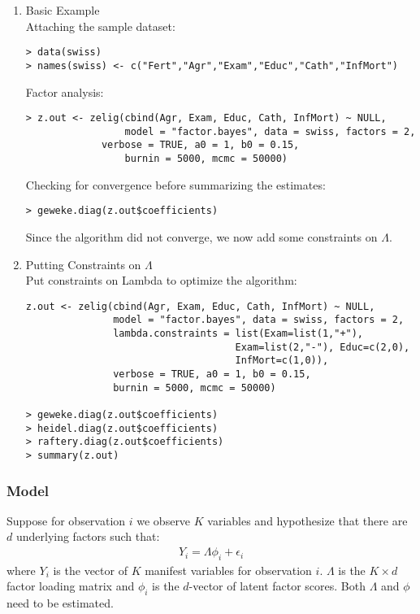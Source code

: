 \begin{enumerate}
\item {Basic Example} \\
Attaching the sample  dataset:
\begin{verbatim}
> data(swiss)
> names(swiss) <- c("Fert","Agr","Exam","Educ","Cath","InfMort")
\end{verbatim}
Factor analysis:
\begin{verbatim}
> z.out <- zelig(cbind(Agr, Exam, Educ, Cath, InfMort) ~ NULL, 
                 model = "factor.bayes", data = swiss, factors = 2,
	         verbose = TRUE, a0 = 1, b0 = 0.15, 
                 burnin = 5000, mcmc = 50000)
\end{verbatim}
Checking for convergence before summarizing the estimates:
\begin{verbatim}
> geweke.diag(z.out$coefficients)
\end{verbatim} %

Since the algorithm did not converge, we now add some constraints on
$\Lambda$. 

\item {Putting Constraints on $\Lambda$} \\
Put constraints on Lambda to optimize the algorithm:
\begin{verbatim} 
z.out <- zelig(cbind(Agr, Exam, Educ, Cath, InfMort) ~ NULL,  
               model = "factor.bayes", data = swiss, factors = 2,
               lambda.constraints = list(Exam=list(1,"+"),
                                    Exam=list(2,"-"), Educ=c(2,0),
                                    InfMort=c(1,0)), 
               verbose = TRUE, a0 = 1, b0 = 0.15, 
               burnin = 5000, mcmc = 50000)

> geweke.diag(z.out$coefficients)
> heidel.diag(z.out$coefficients)
> raftery.diag(z.out$coefficients)
> summary(z.out) 
\end{verbatim} %
\end{enumerate}

\subsubsection{Model} 
Suppose for observation $i$ we observe $K$ variables and hypothesize
that there are $d$ underlying factors such that:  
\begin{eqnarray*}
Y_i = \Lambda \phi_i+\epsilon_i
\end{eqnarray*}
where $Y_{i}$ is the vector of $K$ manifest variables for observation
$i$. $\Lambda$ is the $K \times d$ factor loading matrix and $\phi_i$
is the $d$-vector of latent factor scores. Both $\Lambda$ and $\phi$
need to be estimated.

